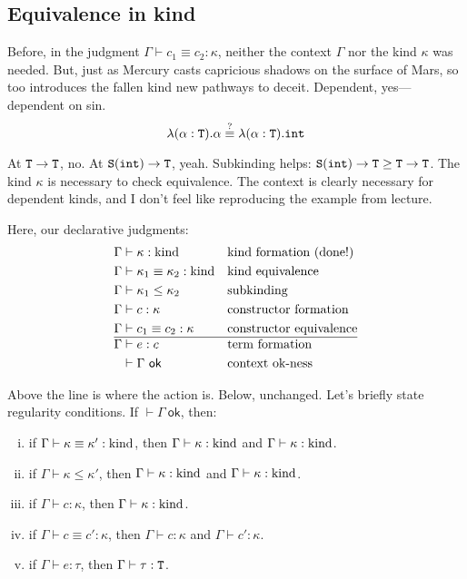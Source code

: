 \subsection{Equivalence in kind}
Before, in the judgment $\Gamma \vdash c_1 \equiv c_2 : \kappa$, neither the context
$\Gamma$ nor the kind $\kappa$ was needed. But, just as Mercury
casts capricious shadows on the surface of Mars, so too introduces the fallen
kind new pathways to deceit. Dependent, yes---dependent on sin.
\[\lambda(\alpha : \textnormal{\texttt{T}}).\alpha \stackrel{?}{\equiv} \lambda(\alpha:\textnormal{\texttt{T}}).\textnormal{\texttt{int}}\]

At $\textnormal{\texttt{T}} \to \textnormal{\texttt{T}}$, no. At $\textnormal{\texttt{S}}(\textnormal{\texttt{int}}) \to \textnormal{\texttt{T}}$, yeah. Subkinding helps:
$\textnormal{\texttt{S}}(\textnormal{\texttt{int}}) \to \textnormal{\texttt{T}} \ge \textnormal{\texttt{T}} \to \textnormal{\texttt{T}}$. The kind $\kappa$ is necessary to check
equivalence. The context is clearly necessary for dependent
kinds, and I don't feel like reproducing the example from lecture.

Here, our declarative judgments:
\begin{align*}
  \Gamma &\vdash \kappa : \textnormal{kind} &&\text{kind formation (done!)}\\
  \Gamma &\vdash \kappa_1 \equiv \kappa_2 : \textnormal{kind} &&\text{kind equivalence}\\
  \Gamma &\vdash \kappa_1 \le \kappa_2 &&\text{subkinding}\\
  \Gamma &\vdash c : \kappa &&\text{constructor formation}\\
  \Gamma &\vdash c_1 \equiv c_2 : \kappa &&\text{constructor equivalence}\\
  \hline
  \Gamma &\vdash e : c &&\text{term formation}\\
  &\vdash \Gamma~\mathsf{ok} &&\text{context ok-ness}
\end{align*}

Above the line is where the action is. Below, unchanged.
Let's briefly state regularity conditions. If $\vdash \Gamma~\mathsf{ok}$, then:
\begin{enumerate}[(i)]
  \item if $\Gamma \vdash \kappa \equiv \kappa' : \textnormal{kind}$, then $\Gamma \vdash \kappa : \textnormal{kind}$
    and $\Gamma \vdash \kappa : \textnormal{kind}$.
  \item if $\Gamma \vdash \kappa \le \kappa'$, then $\Gamma \vdash \kappa : \textnormal{kind}$
    and $\Gamma \vdash \kappa : \textnormal{kind}$.
  \item if $\Gamma \vdash c : \kappa$, then $\Gamma \vdash \kappa : \textnormal{kind}$.
  \item if $\Gamma \vdash c \equiv c' : \kappa$, then $\Gamma \vdash c : \kappa$
    and $\Gamma \vdash c' : \kappa$.
  \item if $\Gamma \vdash e : \tau$, then $\Gamma \vdash \tau : \textnormal{\texttt{T}}$.
\end{enumerate}

